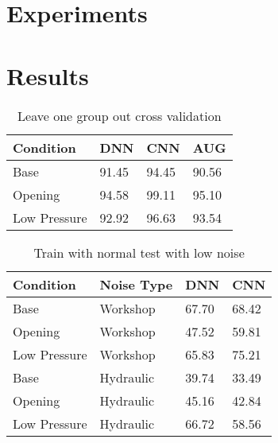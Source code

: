 \section{Experiments}

\section{Results}

\begin{table}[h]
    \centering
    \begin{tabular}{l l l l }
    \toprule
    Condition & DNN & CNN & AUG \\ \midrule
    Base & 91.45 & 94.45 &  90.56\\
    Opening & 94.58 & 99.11 &  95.10\\
    Low Pressure &  92.92 & 96.63 & 93.54\\
    \bottomrule
    \end{tabular}
    \caption{Leave one group out cross validation}
	\label{tab:baseexps}
\end{table}

\begin{table}[h]
    \centering
    \begin{tabular}{l l l l}
    \toprule
    Condition & Noise Type & DNN & CNN \\ \midrule
    Base & Workshop &  67.70 & 68.42 \\
    Opening & Workshop & 47.52 & 59.81 \\
    Low Pressure & Workshop & 65.83 & 75.21 \\ \midrule
    Base & Hydraulic  & 39.74& 33.49  \\
    Opening & Hydraulic & 45.16 & 42.84  \\
    Low Pressure & Hydraulic & 66.72 & 58.56 \\
    \bottomrule
    \end{tabular}
    \caption{Train with normal test with low noise}
	\label{tab:baseexps}
\end{table}







